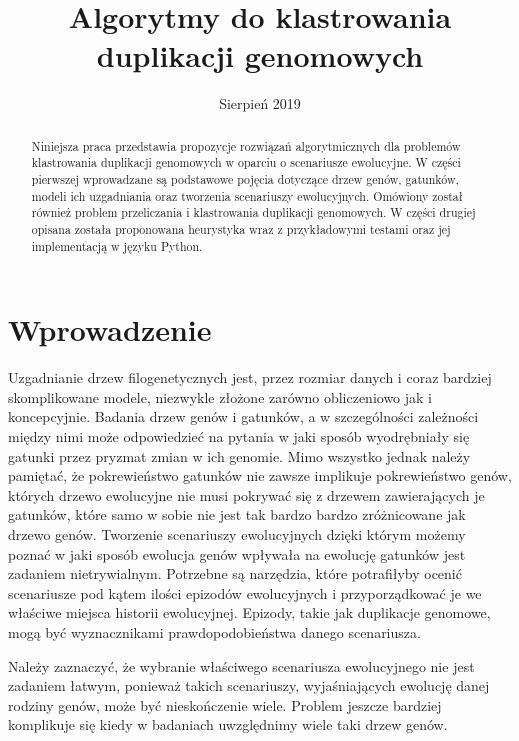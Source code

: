 \documentclass[licencjacka]{pracamgr}
\title{Algorytmy do klastrowania duplikacji genomowych}
\date{Sierpień 2019}
\begin{document}
\maketitle


\begin{abstract}
   Niniejsza praca przedstawia propozycje rozwiązań algorytmicznych dla problemów klastrowania duplikacji genomowych w oparciu o scenariusze ewolucyjne. W części pierwszej wprowadzane są podstawowe pojęcia dotyczące drzew genów, gatunków, modeli ich uzgadniania oraz tworzenia scenariuszy ewolucyjnych. Omówiony został również problem przeliczania i klastrowania duplikacji genomowych. W części drugiej opisana została proponowana heurystyka wraz z przykładowymi testami oraz jej implementacją w języku Python.
\end{abstract}


\renewcommand{\contentsname}{Spis Treści}
\tableofcontents

\chapter*{Wprowadzenie}


Uzgadnianie drzew filogenetycznych jest, przez rozmiar danych i coraz bardziej skomplikowane modele, niezwykle złożone zarówno obliczeniowo jak i koncepcyjnie. Badania drzew genów i gatunków, a w szczególności zależności między nimi może odpowiedzieć na pytania w jaki sposób wyodrębniały się gatunki przez pryzmat zmian w ich genomie. Mimo wszystko jednak należy pamiętać, że pokrewieństwo gatunków nie zawsze implikuje pokrewieństwo genów, których drzewo ewolucyjne nie musi pokrywać się z drzewem zawierających je gatunków, które samo w sobie nie jest tak bardzo bardzo zróżnicowane jak drzewo genów. Tworzenie scenariuszy ewolucyjnych dzięki którym możemy poznać w jaki sposób ewolucja genów wpływała na ewolucję gatunków jest zadaniem nietrywialnym. Potrzebne są narzędzia, które potrafiłyby ocenić scenariusze pod kątem ilości epizodów ewolucyjnych i przyporządkować je we właściwe miejsca historii ewolucyjnej. Epizody, takie jak duplikacje genomowe, mogą być wyznacznikami prawdopodobieństwa danego scenariusza.

Należy zaznaczyć, że wybranie właściwego scenariusza ewolucyjnego nie jest zadaniem łatwym, ponieważ takich scenariuszy, wyjaśniających ewolucję danej rodziny genów, może być nieskończenie wiele. Problem jeszcze bardziej komplikuje się kiedy w badaniach uwzględnimy wiele taki drzew genów.
\end{document}
